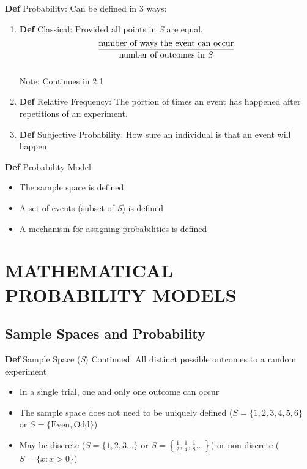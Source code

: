 \documentclass[11pt,notitlepage]{report}
\begin{document}
\textbf{Def} Probability: Can be defined in 3 ways:
\begin{enumerate}
    \item \textbf{Def} Classical: Provided all points in \textit{S} are equal, $$\frac{\text{number of ways the event can occur}}{\text{number of outcomes in \textit{S}}}$$\\
\hspace*{5mm} Note: Continues in 2.1
    \item \textbf{Def} Relative Frequency: The portion of times an event has happened after repetitions of an experiment.
    \item \textbf{Def} Subjective Probability: How sure an individual is that an event will happen.
\end{enumerate}

\textbf{Def} Probability Model: 
\begin{itemize}
    \item The sample space is defined
    \item A set of events (subset of \textit{S}) is defined
    \item A mechanism for assigning probabilities is defined
\end{itemize}

\newpage


\chapter{MATHEMATICAL PROBABILITY MODELS}

\section{Sample Spaces and Probability}

\textbf{Def} Sample Space (\textit{S}) Continued: All distinct possible outcomes to a random experiment
\begin{itemize}
    \item In a single trial, one and only one outcome can occur
    \item The sample space does not need to be uniquely defined ($\textit{S} = \{1, 2, 3, 4, 5, 6\}$ or $\textit{S} = \{\text{Even}, \text{Odd}\}$)
    \item May be discrete ($\textit{S} = \{1, 2, 3 \dots\}$ or $\textit{S} = \left\{\frac{1}{2}, \frac{1}{4}, \frac{1}{8} \dots\right\}$) or non-discrete ($\textit{S} = \{x:x>0\}$)
\end{itemize}
\end{document}
